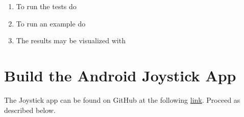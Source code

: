 \begin{enumerate}
	\item To run the tests do
	\newline {}
	\newline {}
	\item To run an example do
	\newline {}
	\newline {}
	\item The results may be visualized with
	\newline {}
	\newline {}
\end{enumerate}
\section{Build the Android Joystick App}
\label{sec::A2_aa}
The Joystick app can be found on GitHub at the following \href{https://github.com/mhubii/ijoy}{link}. Proceed as described below.
